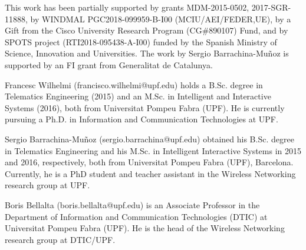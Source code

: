 \documentclass[journal]{IEEEtran}
\begin{document}
This work has been partially supported by grants MDM-2015-0502, 2017-SGR-11888, by WINDMAL PGC2018-099959-B-I00 (MCIU/AEI/FEDER,UE), by a Gift from the Cisco University Research Program (CG\#890107) Fund, and by SPOTS project (RTI2018-095438-A-I00) funded by the Spanish Ministry of Science, Innovation and Universities. The work by Sergio Barrachina-Mu\~noz is supported by an FI grant from Generalitat de Catalunya.

\ifCLASSOPTIONcaptionsoff
  \newpage
\fi






\begin{IEEEbiographynophoto}{Francesc Wilhelmi}
(francisco.wilhelmi@upf.edu) holds a B.Sc. degree in Telematics Engineering (2015) and an M.Sc. in Intelligent and Interactive Systems (2016), both from Universitat Pompeu Fabra (UPF). He is currently pursuing a Ph.D. in Information and Communication Technologies at UPF.
\end{IEEEbiographynophoto}

\begin{IEEEbiographynophoto}{Sergio Barrachina-Mu\~noz}
(sergio.barrachina@upf.edu) obtained his B.Sc. degree in Telematics Engineering and his M.Sc. in Intelligent Interactive Systems in 2015 and 2016, respectively, both from Universitat Pompeu Fabra (UPF), Barcelona. Currently, he is a PhD student and teacher assistant in the Wireless Networking research group at UPF.
\end{IEEEbiographynophoto}

\begin{IEEEbiographynophoto}{Boris Bellalta}
(boris.bellalta@upf.edu) is an Associate Professor in the Department of Information and Communication Technologies (DTIC) at Universitat Pompeu Fabra (UPF). He is the head of the Wireless Networking research group at DTIC/UPF.
\end{IEEEbiographynophoto}
\end{document}
